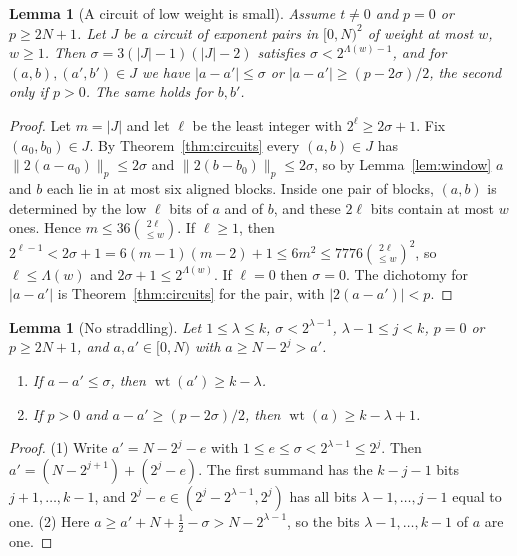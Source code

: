 \documentclass[11pt]{article}
\newtheorem{lemma}[theorem]{Lemma}
\theoremstyle{definition}\newtheorem{definition}[theorem]{Definition}
\theoremstyle{remark}\newtheorem{remark}[theorem]{Remark}
\newcommand{\wt}{\operatorname{wt}}
\begin{document}
\begin{lemma}[A circuit of low weight is small]\label{lem:smallcircuit}
Assume $t\ne0$ and $p=0$ or $p\ge2N+1$. Let $J$ be a circuit of exponent
pairs in $[0,N)^2$ of weight at most $w$, $w\ge1$. Then
$\sigma=3(|J|-1)(|J|-2)$ satisfies $\sigma<2^{\Lambda(w)-1}$, and for
$(a,b),(a',b')\in J$ we have $|a-a'|\le\sigma$ or
$|a-a'|\ge(p-2\sigma)/2$, the second only if $p>0$. The same holds for
$b,b'$.
\end{lemma}
\begin{proof}
Let $m=|J|$ and let $\ell$ be the least integer with
$2^\ell\ge2\sigma+1$. Fix $(a_0,b_0)\in J$. By
Theorem~\ref{thm:circuits} every $(a,b)\in J$ has
$\|2(a-a_0)\|_p\le2\sigma$ and $\|2(b-b_0)\|_p\le2\sigma$, so by
Lemma~\ref{lem:window} $a$ and $b$ each lie in at most six aligned blocks.
Inside one pair of blocks, $(a,b)$ is determined by the low $\ell$ bits of
$a$ and of $b$, and these $2\ell$ bits contain at most $w$ ones. Hence
$m\le36\binom{2\ell}{\le w}$. If $\ell\ge1$, then
$2^{\ell-1}<2\sigma+1=6(m-1)(m-2)+1\le6m^2\le7776\binom{2\ell}{\le w}^2$,
so $\ell\le\Lambda(w)$ and $2\sigma+1\le2^{\Lambda(w)}$. If $\ell=0$ then
$\sigma=0$. The dichotomy for $|a-a'|$ is Theorem~\ref{thm:circuits} for
the pair, with $|2(a-a')|<p$.
\end{proof}

\begin{lemma}[No straddling]\label{lem:straddle}
Let $1\le\lambda\le k$, $\sigma<2^{\lambda-1}$, $\lambda-1\le j<k$,
$p=0$ or $p\ge2N+1$, and $a,a'\in[0,N)$ with $a\ge N-2^j>a'$.
\begin{enumerate}
\item If $a-a'\le\sigma$, then $\wt(a')\ge k-\lambda$.
\item If $p>0$ and $a-a'\ge(p-2\sigma)/2$, then $\wt(a)\ge k-\lambda+1$.
\end{enumerate}
\end{lemma}
\begin{proof}
(1) Write $a'=N-2^j-e$ with $1\le e\le\sigma<2^{\lambda-1}\le2^j$. Then
$a'=(N-2^{j+1})+(2^j-e)$. The first summand has the $k-j-1$ bits
$j+1,\ldots,k-1$, and $2^j-e\in(2^j-2^{\lambda-1},2^j)$ has all bits
$\lambda-1,\ldots,j-1$ equal to one. (2) Here
$a\ge a'+N+\frac12-\sigma>N-2^{\lambda-1}$, so the bits
$\lambda-1,\ldots,k-1$ of $a$ are one.
\end{proof}
\end{document}

